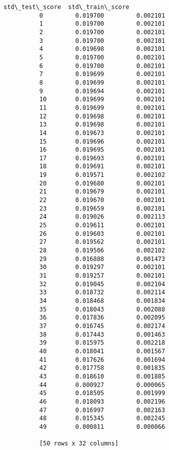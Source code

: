 \documentclass[11pt]{article}
\begin{document}
\begin{Verbatim}[commandchars=\\\{\}]
              std\_test\_score  std\_train\_score  
          0         0.019700         0.002101  
          1         0.019700         0.002101  
          2         0.019700         0.002101  
          3         0.019700         0.002101  
          4         0.019698         0.002101  
          5         0.019700         0.002101  
          6         0.019700         0.002101  
          7         0.019699         0.002101  
          8         0.019699         0.002101  
          9         0.019694         0.002101  
          10        0.019699         0.002101  
          11        0.019699         0.002101  
          12        0.019698         0.002101  
          13        0.019698         0.002101  
          14        0.019673         0.002101  
          15        0.019696         0.002101  
          16        0.019695         0.002101  
          17        0.019693         0.002101  
          18        0.019691         0.002101  
          19        0.019571         0.002102  
          20        0.019680         0.002101  
          21        0.019679         0.002101  
          22        0.019670         0.002101  
          23        0.019659         0.002101  
          24        0.019026         0.002113  
          25        0.019611         0.002101  
          26        0.019603         0.002101  
          27        0.019562         0.002101  
          28        0.019506         0.002102  
          29        0.016888         0.001473  
          30        0.019297         0.002101  
          31        0.019257         0.002101  
          32        0.019045         0.002104  
          33        0.018732         0.002114  
          34        0.018468         0.001834  
          35        0.018043         0.002088  
          36        0.017836         0.002095  
          37        0.016745         0.002174  
          38        0.017443         0.001463  
          39        0.015975         0.002218  
          40        0.018041         0.001567  
          41        0.017626         0.001694  
          42        0.017758         0.001835  
          43        0.018610         0.001885  
          44        0.000927         0.000065  
          45        0.018505         0.001999  
          46        0.018093         0.002196  
          47        0.016997         0.002163  
          48        0.015345         0.002245  
          49        0.000811         0.000066  
          
          [50 rows x 32 columns]
\end{Verbatim}
        
\end{document}
